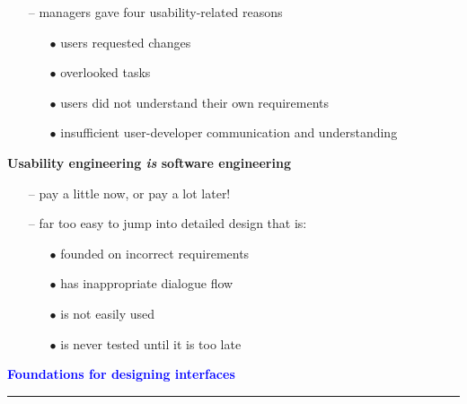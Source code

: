 \documentclass[pdf]{beamer}
\begin{document}
{{{{{{{{\begin{frame}
    \begin{itemize}
    	\item[{--}] managers gave four usability-related reasons
        \begin{itemize}
        	\item[{$\bullet$}] users requested changes
            \item[{$\bullet$}] overlooked tasks
            \item[{$\bullet$}] users did not understand their own requirements 
            \item[{$\bullet$}] insufficient user-developer communication and understanding
     	\end{itemize}
   	\end{itemize}
     	\bigskip
     	\textbf {Usability engineering \textit{is} software engineering}
		\begin{itemize}
        \item[{--}] pay a little now, or pay a lot later! 
        \item[{--}] far too easy to jump into detailed design that is: 
        	\begin{itemize}
        	\item[{$\bullet$}] founded on incorrect requirements
          	\item[{$\bullet$}] has inappropriate dialogue flow
            \item[{$\bullet$}] is not easily used
         	\item[{$\bullet$}] is never tested until it is too late
        \end{itemize}
	\end{itemize}
    \bigskip
    \bigskip
\end{frame}}




{
\begin{frame}
	\vspace{8mm}
	\textcolor{Blue}{\textbf{\Large{Foundations for designing interfaces}}}
    \textcolor{red}{\rule{10cm}{1mm}}
    

\end{frame}}}}}}}}}
\end{document}
